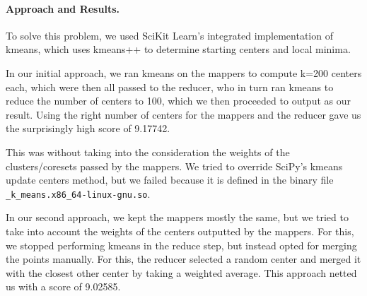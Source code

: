 \documentclass[a4paper, 11pt]{article}
\begin{document}

\paragraph{Approach and Results.\!\!\!}

To solve this problem, we used SciKit Learn's integrated implementation of kmeans, which uses kmeans++ to determine starting centers and local minima.

In our initial approach, we ran kmeans on the mappers to compute k=200 centers each, which were then all passed to the reducer, who in turn ran kmeans to reduce the number of centers to 100, which we then proceeded to output as our result. Using the right number of centers for the mappers and the reducer gave us the surprisingly high score of 9.17742.

This was without taking into the consideration the weights of the clusters/coresets passed by the mappers. We tried to override SciPy's kmeans update centers method, but we failed because it is defined in the binary file \verb|_k_means.x86_64-linux-gnu.so|. 

In our second approach, we kept the mappers mostly the same, but we tried to take into account the weights of the centers outputted by the mappers. For this, we stopped performing kmeans in the reduce step, but instead opted for merging the points manually. For this, the reducer selected a random center and merged it with the closest other center by taking a weighted average.
This approach netted us with a score of 9.02585.





\end{document}
